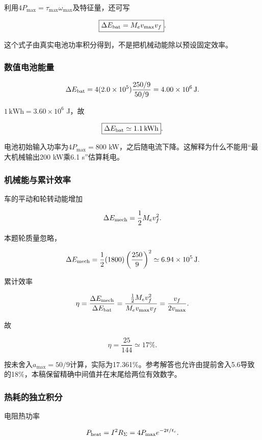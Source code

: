\documentclass[12pt,a4paper,fontset=fandol]{ctexart}
\begin{document}
利用\(4P_{\max}=\tau_{\max}\omega_{\max}\)及特征量，还可写

\[
\boxed{\Delta E_{\rm bat}=M_ev_{\max}v_f}.
\]

这个式子由真实电池功率积分得到，不是把机械动能除以预设固定效率。

\subsubsection{数值电池能量}\label{ux6570ux503cux7535ux6c60ux80fdux91cf}

\[
\Delta E_{\rm bat}
=4(2.0\times10^5)\frac{250/9}{50/9}
=4.00\times10^6\,\mathrm J.
\]

\(1\,\mathrm{kWh}=3.60\times10^6\) J，故

\[
\boxed{\Delta E_{\rm bat}\simeq1.1\,\mathrm{kWh}}.
\]

电池初始输入功率为\(4P_{\max}=800\)
kW，之后随电流下降。这解释为什么不能用``最大机械输出200 kW乘6.1
s''估算耗电。

\subsubsection{机械能与累计效率}\label{ux673aux68b0ux80fdux4e0eux7d2fux8ba1ux6548ux7387}

车的平动和轮转动能增加

\[
\Delta E_{\rm mech}=\frac12M_ev_f^2.
\]

本题轮质量忽略，

\[
\Delta E_{\rm mech}
=\frac12(1800)\left(\frac{250}{9}\right)^2
\simeq6.94\times10^5\,\mathrm J.
\]

累计效率

\[
\eta=\frac{\Delta E_{\rm mech}}{\Delta E_{\rm bat}}
=\frac{\tfrac12M_ev_f^2}{M_ev_{\max}v_f}
=\frac{v_f}{2v_{\max}}.
\]

故

\[
\boxed{\eta=\frac{25}{144}\simeq17\%}.
\]

按未舍入\(a_{\max}=50/9\)计算，实际为17.361\%。参考解答也允许由提前舍入5.6导致的18\%，本稿保留精确中间值并在末尾给两位有效数字。

\subsubsection{热耗的独立积分}\label{ux70edux8017ux7684ux72ecux7acbux79efux5206}

电阻热功率

\[
P_{\rm heat}=I^2R_\Sigma
=4P_{\max}e^{-2t/t_c}.
\]
\end{document}
